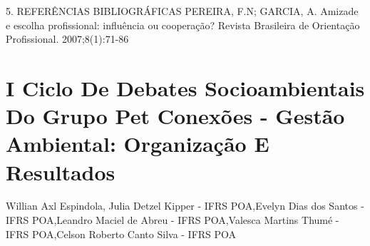 5. REFERÊNCIAS BIBLIOGRÁFICAS
PEREIRA, F.N; GARCIA, A. Amizade e escolha profissional: influência ou cooperação? Revista Brasileira de Orientação Profissional. 2007;8(1):71-86




\section*{I Ciclo De Debates Socioambientais Do Grupo Pet Conexões - Gestão Ambiental: Organização E Resultados}

Willian Axl Espindola, Julia Detzel Kipper - IFRS POA,Evelyn Dias dos Santos - IFRS POA,Leandro Maciel de Abreu - IFRS POA,Valesca Martins Thumé - IFRS POA,Celson Roberto Canto Silva - IFRS POA

